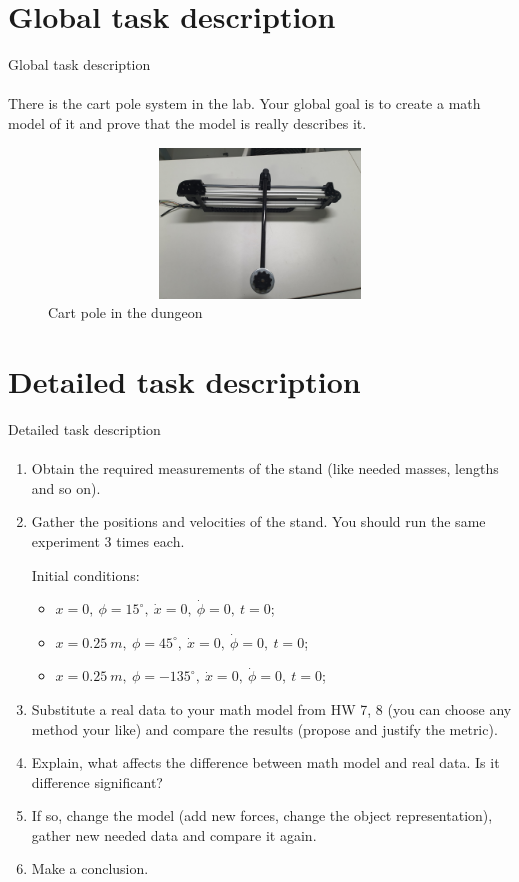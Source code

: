 \documentclass[aspectratio=169]{beamer}
\begin{document}
\section{Global task description}
\begin{frame}[t]{Global task description}
  \vspace{-0.4cm}
\framesubtitle{}
      There is the cart pole system in the lab. Your global goal is to create a math model of it and prove that the model is really describes it.
      \medskip

      \begin{figure}[H]
        \centering\includegraphics[height=4cm,width=1\textwidth,keepaspectratio]{experimental_stand.JPG}
        \caption*{Cart pole in the dungeon}
        \label{fig:experimental_stand.JPG}
      \end{figure}
\end{frame}


\section{Detailed task description}
\begin{frame}[t]{Detailed task description}
\framesubtitle{}
\vspace{-0.4cm}
\footnotesize
\begin{enumerate}
  \item Obtain the required measurements of the stand (like needed masses, lengths and so on).
  \item Gather the positions and velocities of the stand. You should run the same experiment 3 times each. 
  
  Initial conditions:
  \begin{itemize}
    \footnotesize
    \item $x = 0,\ \phi = 15^\circ,\ \dot{x} = 0,\ \dot{\phi} = 0,\ t=0$;
    \item $x = 0.25\ m,\ \phi = 45^\circ,\ \dot{x} = 0,\ \dot{\phi} = 0,\ t=0$;
    \item $x = 0.25\ m,\ \phi = -135^\circ,\ \dot{x} = 0,\ \dot{\phi} = 0,\ t=0$;
  \end{itemize}
  \item Substitute a real data to your math model from HW 7, 8 (you can choose any method your like) and compare the results (propose and justify the metric).
  \item Explain, what affects the difference between math model and real data. Is it difference significant? 
  \item If so, change the model (add new forces, change the object representation), gather new needed data and compare it again.
  \item Make a conclusion.
\end{enumerate}
\end{frame}
\end{document}
